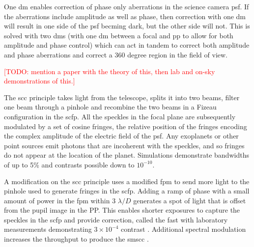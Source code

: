 \documentclass[letterpaper]{ar-1col}
\newcommand{\ld}{$\lambda/D$}
\newcommand{\todo}[1]{\textcolor{red}{[TODO: #1]}}
\begin{document}
%

One \ac{dm} enables correction of phase only aberrations in the science camera \ac{psf}.
%
If the aberrations include amplitude as well as phase, then correction with one \ac{dm} will result in one side of the \ac{psf} becming dark, but the other side will not.
%
This is solved with two \acp{dm} (with one \ac{dm} between a focal and \ac{pp} to allow for both amplitude and phase control) which can act in tandem to correct both amplitude and phase aberrations and correct a 360 degree region in the field of view.
%

\todo{mention a paper with the theory of this, then lab and on-sky demonstrations of this.}


%
The \acl{scc} \citep[\acs{scc}; ][]{Baudoz06} principle takes light from the telescope, splits it into two beams, filter one beam through a pinhole and recombine the two beams in a Fizeau configuration in the \ac{scfp}.
%
All the speckles in the focal plane are subsequently modulated by a set of cosine fringes, the relative position of the fringes encoding the complex amplitude of the electric field of the \ac{psf}.
%
Any exoplanets or other point sources emit photons that are incoherent with the speckles, and so fringes do not appear at the location of the planet.
%
Simulations demonstrate \citep{Galicher10} bandwidths of up to 5\% and contrasts possible down to $10^{-10}$.

A modification on the \ac{scc} principle uses a modified \ac{fpm} to send more light to the pinhole used to generate fringes in the \ac{scfp}.
%
Adding a ramp of phase with a small amount of power in the \ac{fpm} within 3 \ld{} generates a spot of light that is offset from the pupil image in the PP.
%
This enables shorter exposures to capture the speckles in the \ac{scfp} and provide correction, called the \acl{fast} \citep[\acs{fast}; ][]{Gerard18} with laboratory measurements demonstrating $3\times 10^{-4}$ contrast \citep{Gerard22}.
%
Additional spectral modulation increases the throughput to produce the \acl{smscc} \citep[\acs{smscc}; ][]{Haffert22a}.

\begin{armarginnote}[]
\end{armarginnote}
\end{document}

